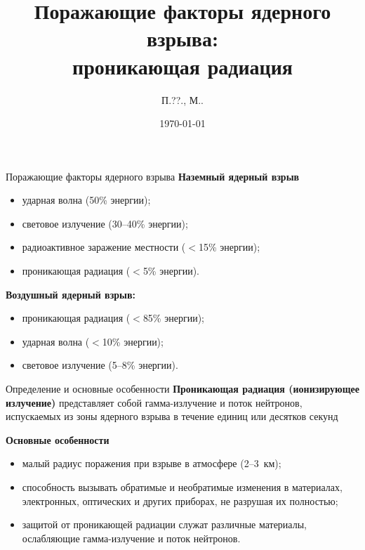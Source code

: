 \documentclass[unicode,lefteqn,c,hyperref={pdfpagelabels=false},12pt]{beamer}
\title[\hbox to 56mm{Проникающая радиация\hfill\insertframenumber\,/\,\inserttotalframenumber}]{Поражающие факторы ядерного взрыва: \\проникающая радиация}
\author[П.\shortspace ??.\shortspaceАндрианов, М.\shortspaceО.\shortspaceБурмистров]{П.\shortspace ??.\shortspaceАндрианов, М.\shortspaceО.\shortspaceБурмистров}
\institute{\vfill Московский физико-технический институт
		\vfill Военная кафедра}
\date{\today}
\begin{document}
\begin{frame}
    \titlepage
\end{frame}
\begin{frame}{Поражающие факторы ядерного взрыва}
    \textbf{Наземный ядерный взрыв}
    \begin{itemize}
    		\item ударная волна (50\% энергии);
    		\item световое излучение (30--40\% энергии);
    		\item радиоактивное заражение местности ($<$15\% энергии);
            \item проникающая радиация ($<$5\% энергии).
    \end{itemize}
    \bigskip
    \textbf{Воздушный ядерный взрыв:}
    \begin{itemize}
            \item проникающая радиация ($<$85\% энергии);
            \item ударная волна ($<$10\% энергии);
            \item световое излучение (5--8\% энергии).
    \end{itemize}

  
\end{frame}

\begin{frame}{Определение и основные особенности}
    \textbf{Проникающая радиация (ионизирующее излучение)}  представляет собой гамма-излучение и поток нейтронов, испускаемых из зоны ядерного взрыва в течение единиц или десятков секунд

    \smallskip

    \textbf{Основные особенности}
    \begin{itemize}
            \item малый радиус поражения при взрыве в атмосфере (2--3~км);
            \item способность вызывать обратимые и необратимые изменения в материалах, электронных, оптических и других приборах, не разрушая их полностью;
            \item защитой от проникающей радиации служат различные материалы, ослабляющие гамма-излучение и поток нейтронов.
    \end{itemize}
\end{frame}
\end{document}
